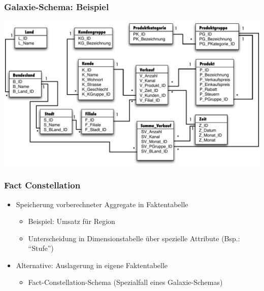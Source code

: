                 \begin{frame}
        
                \frametitle{Galaxie-Schema: Beispiel}
        
                \begin{center}
                  \includegraphics[height=\textAreaHeight,width=\textwidth,keepaspectratio]{fig6/GalaxySchema-Beispiel.pdf}
                \end{center}
        
                \end{frame}
        
                \begin{frame}
        
                \frametitle{Fact Constellation}
                \begin{itemize}
                \item Speicherung vorberechneter Aggregate in Faktentabelle
                  \begin{itemize}
                  \item Beispiel: Umsatz für Region
                  \item Unterscheidung in Dimensionstabelle über spezielle Attribute
                    (Bsp.: "`Stufe"')
                  \end{itemize}
                \item Alternative: Auslagerung in eigene Faktentabelle
                  \begin{itemize}
                  \item Fact-Constellation-Schema (Spezialfall eines Galaxie-Schemas)
                  \end{itemize}
                \end{itemize}
        
                \end{frame}
        

